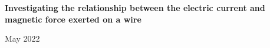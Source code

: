\documentclass[11pt]{article}
\begin{document}
	\begin{center}
		\textbf{\Large Investigating the relationship between the electric current and magnetic force exerted on a wire}

		\vspace*{8pt}

		May 2022
	\end{center}

    

	

	

	

	

	

	\newpage

	\printbibliography[
		heading=bibintoc,
		title={Bibliography}
	]
	
	\vfill
	
\end{document}
